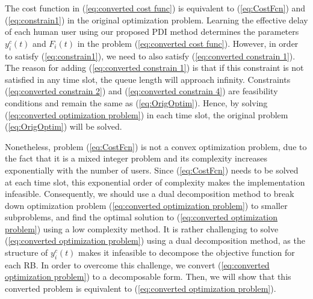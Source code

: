 \documentclass[journal,draftclsnofoot,onecolumn,12pt]{IEEEtran}%
\begin{document}
The cost function in (\ref{eq:converted cost func}) is equivalent to (\ref{eq:CostFcn}) and (\ref{eq:constrain1}) in the original optimization problem. Learning the effective delay of each human user using our proposed PDI method determines the parameters {$y^c_i(t)$} and $F_i(t)$ in the problem (\ref{eq:converted cost func}). However, in order to satisfy (\ref{eq:constrain1}), we need to also satisfy (\ref{eq:converted constrain 1}). The reason for adding (\ref{eq:converted constrain 1}) is that if this constraint is not satisfied in any time slot, the queue length will approach infinity. Constraints (\ref{eq:converted constrain 2}) and (\ref{eq:converted constrain 4}) are feasibility conditions and remain the same as (\ref{eq:OrigOptim}).
Hence, by solving (\ref{eq:converted optimization problem}) in each time slot, the original problem (\ref{eq:OrigOptim}) will be solved. 

Nonetheless,  
 problem (\ref{eq:CostFcn})  is not a convex optimization problem, due to the fact that it is a mixed integer problem  and its complexity increases exponentially with the number of users. Since (\ref{eq:CostFcn}) needs to be solved at each time slot, this exponential order of complexity makes the implementation infeasible. Consequently, we should use a dual decomposition method to break down optimization problem (\ref{eq:converted optimization problem}) to smaller subproblems, and find the optimal solution to (\ref{eq:converted optimization problem})  using a low complexity method.
It is rather challenging to solve (\ref{eq:converted optimization problem}) using a dual decomposition method, as the structure of {$y^c_i(t)$} makes it infeasible to decompose the objective function for each RB. In order to overcome this challenge, we convert (\ref{eq:converted optimization problem}) to a decomposable form. Then, we will show that this converted problem is equivalent to (\ref{eq:converted optimization problem}).
\end{document}
